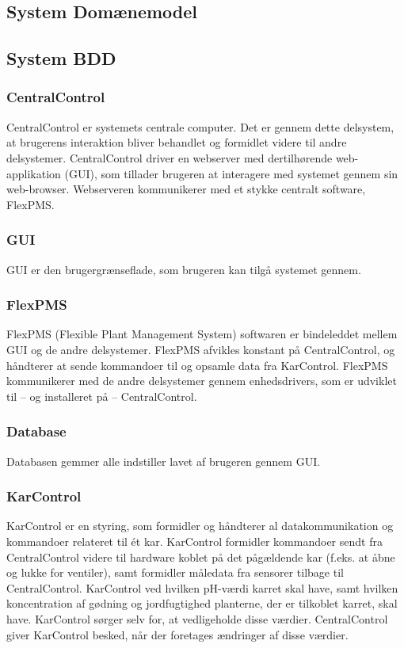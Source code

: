 
\subsection{System Domænemodel}


\subsection{System BDD}


\subsubsection{CentralControl}
CentralControl er systemets centrale computer. Det er gennem dette delsystem, at brugerens interaktion bliver behandlet og formidlet videre til andre delsystemer. CentralControl driver en webserver med dertilhørende web-applikation (GUI), som tillader brugeren at interagere med systemet gennem sin web-browser. Webserveren kommunikerer med et stykke centralt software, FlexPMS.

\subsubsection{GUI}
GUI er den brugergrænseflade, som brugeren kan tilgå systemet gennem.

\subsubsection{FlexPMS}
FlexPMS (Flexible Plant Management System) softwaren er bindeleddet mellem GUI og de andre delsystemer. FlexPMS afvikles konstant på CentralControl, og håndterer at sende kommandoer til og opsamle data fra KarControl. FlexPMS kommunikerer med de andre delsystemer gennem enhedsdrivers, som er udviklet til – og installeret på – CentralControl.

\subsubsection{Database}
Databasen gemmer alle indstiller lavet af brugeren gennem GUI.

\subsubsection{KarControl}
KarControl er en styring, som formidler og håndterer al datakommunikation og kommandoer relateret til ét kar. KarControl formidler kommandoer sendt fra CentralControl videre til hardware koblet på det pågældende kar (f.eks. at åbne og lukke for ventiler), samt formidler måledata fra sensorer tilbage til CentralControl. KarControl ved hvilken pH-værdi karret skal have, samt hvilken koncentration af gødning og jordfugtighed planterne, der er tilkoblet karret, skal have. KarControl sørger selv for, at vedligeholde disse værdier. CentralControl giver KarControl besked, når der foretages ændringer af disse værdier.

